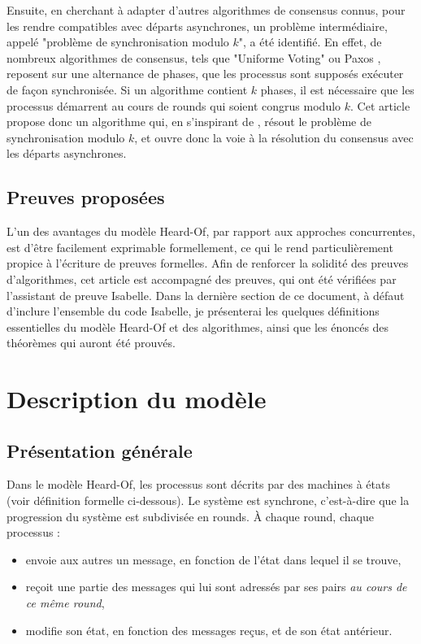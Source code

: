 \documentclass{article}
\begin{document}
Ensuite, en cherchant à adapter d'autres algorithmes de consensus connus,
pour les rendre compatibles avec départs asynchrones, un problème intermédiaire, appelé "problème de synchronisation modulo $k$", a été identifié.
En effet, de nombreux algorithmes de consensus, tels que "Uniforme Voting" \cite{model_ho} ou Paxos \cite{paxos},
reposent sur une alternance de phases, que les processus sont supposés exécuter de façon synchronisée.
Si un algorithme contient $k$ phases, il est nécessaire que les processus démarrent au cours de rounds qui soient congrus modulo $k$.
Cet article propose donc un algorithme qui, en s'inspirant de \cite{firing_squad},
résout le problème de synchronisation modulo $k$, et ouvre donc la voie à la résolution du consensus avec les départs asynchrones.

\subsection{Preuves proposées}

L'un des avantages du modèle Heard-Of, par rapport aux approches concurrentes, est d'être facilement exprimable formellement, ce qui le rend particulièrement propice à l'écriture de preuves formelles.
Afin de renforcer la solidité des preuves d'algorithmes, cet article est accompagné des preuves, qui ont été vérifiées par l'assistant de preuve Isabelle.
Dans la dernière section de ce document, à défaut d'inclure l'ensemble du code Isabelle, je présenterai les quelques définitions essentielles du modèle Heard-Of et des algorithmes, ainsi que
les énoncés des théorèmes qui auront été prouvés.

\section{Description du modèle}

\subsection{Présentation générale}

Dans le modèle Heard-Of, les processus sont décrits par des machines à états (voir définition formelle ci-dessous).
Le système est synchrone, c'est-à-dire que la progression du système est subdivisée en rounds. À chaque round, chaque processus :
\begin{itemize}
	\item envoie aux autres un message, en fonction de l'état dans lequel il se trouve,
	\item reçoit une partie des messages qui lui sont adressés par ses pairs \emph{au cours de ce même round},
	\item modifie son état, en fonction des messages reçus, et de son état antérieur.
\end{itemize}
\end{document}
